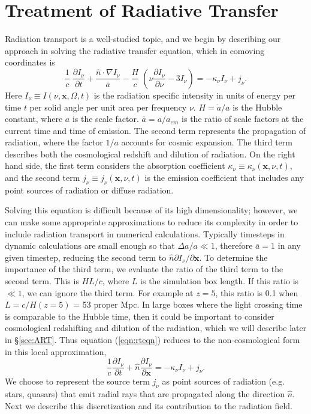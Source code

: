 \documentclass[apj,onecolumn]{emulateapj}
\begin{document}
\section{Treatment of Radiative Transfer}

Radiation transport is a well-studied topic, and we begin by
describing our approach in solving the radiative transfer equation,
which in comoving coordinates \citep{Gnedin97} is
%
\begin{equation}
  \label{eqn:rteqn}
  \frac{1}{c} \; \frac{\partial I_\nu}{\partial t} + 
  \frac{\hat{n} \cdot \nabla I_\nu}{\bar{a}} -
  \frac{H}{c} \; \left( \nu \frac{\partial I_\nu}{\partial \nu} -
  3 I_\nu \right) = -\kappa_\nu I_\nu + j_\nu .
\end{equation}
%
Here $I_\nu \equiv I(\nu, \mathbf{x}, \Omega, t)$ is the radiation
specific intensity in units of energy per time $t$ per solid angle per
unit area per frequency $\nu$.  $H = \dot{a}/a$ is the Hubble
constant, where $a$ is the scale factor.  $\bar{a} = a/a_{em}$ is the
ratio of scale factors at the current time and time of emission.  The
second term represents the propagation of radiation, where the factor
$1/a$ accounts for cosmic expansion.  The third term describes both
the cosmological redshift and dilution of radiation.  On the right
hand side, the first term considers the absorption coefficient
$\kappa_\nu \equiv \kappa_\nu(\mathbf{x},\nu,t)$, and the second term
$j_\nu \equiv j_\nu(\mathbf{x},\nu,t)$ is the emission coefficient
that includes any point sources of radiation or diffuse radiation.

Solving this equation is difficult because of its high dimensionality;
however, we can make some appropriate approximations to reduce its
complexity in order to include radiation transport in numerical
calculations.  Typically timesteps in dynamic calculations are small
enough so that $\Delta a/a \ll 1$, therefore $\bar{a} = 1$ in any
given timestep, reducing the second term to $\hat{n} \partial
I_\nu/\partial \mathbf{x}$.  To determine the importance of the third
term, we evaluate the ratio of the third term to the second term.
This is $HL/c$, where $L$ is the simulation box length.  If this ratio
is $\ll 1$, we can ignore the third term.  For example at $z=5$, this
ratio is 0.1 when $L = c/H(z=5)$ = 53 proper Mpc.  In large boxes
where the light crossing time is comparable to the Hubble time, then
it could be important to consider cosmological redshifting and
dilution of the radiation, which we will describe later in
\S\ref{sec:ART}.  Thus equation (\ref{eqn:rteqn}) reduces to the
non-cosmological form in this local approximation,
%
\begin{equation}
  \frac{1}{c} \frac{\partial I_\nu}{\partial t} + 
  \hat{n} \frac{\partial I_\nu}{\partial \mathbf{x}} =
  -\kappa_\nu I_\nu + j_\nu .
\end{equation}
%
We choose to represent the source term $j_\nu$ as point sources of
radiation (e.g. stars, quasars) that emit radial rays that are
propagated along the direction $\hat{n}$.  Next we describe this
discretization and its contribution to the radiation field.
\end{document}
